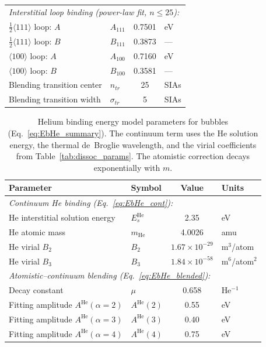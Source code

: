 \documentclass[pdflatex,sn-basic]{sn-jnl} %
\begin{document}
\begin{table}[htbp]
\begin{tabular}{@{}llcl@{}}
\multicolumn{4}{l}{\emph{Interstitial loop binding (power-law fit, $n \leq 25$):}} \\
$\frac{1}{2}\langle111\rangle$ loop: $A$ & $A_{111}$ & 0.7501 & eV \\
$\frac{1}{2}\langle111\rangle$ loop: $B$ & $B_{111}$ & 0.3873 & --- \\
$\langle100\rangle$ loop: $A$ & $A_{100}$ & 0.7160 & eV \\
$\langle100\rangle$ loop: $B$ & $B_{100}$ & 0.3581 & --- \\
Blending transition center & $n_{tr}$ & 25 & SIAs \\
Blending transition width & $\sigma_{tr}$ & 5 & SIAs \\
\bottomrule
\end{tabular}
\end{table}

\begin{table}[htbp]
\centering
\caption{Helium binding energy model parameters for bubbles
(Eq.~\ref{eq:EbHe_summary}). The continuum term uses the He solution energy,
the thermal de~Broglie wavelength, and the virial coefficients from
Table~\ref{tab:dissoc_params}. The atomistic correction decays exponentially
with $m$.}
\label{tab:He_binding_params}
\renewcommand{\arraystretch}{1.15}
\begin{tabular}{@{}llcl@{}}
\toprule
\textbf{Parameter} & \textbf{Symbol} & \textbf{Value} & \textbf{Units} \\
\midrule
\multicolumn{4}{l}{\emph{Continuum He binding (Eq.~\ref{eq:EbHe_cont}):}} \\
He interstitial solution energy & $E_s^{\mathrm{He}}$ & 2.35 & eV \\
He atomic mass & $m_{\mathrm{He}}$ & 4.0026 & amu \\
He virial $B_2$ & $B_2$ & $1.67\times10^{-29}$ & m$^3$/atom \\
He virial $B_3$ & $B_3$ & $1.84\times10^{-58}$ & m$^6$/atom$^2$ \\[4pt]

\multicolumn{4}{l}{\emph{Atomistic--continuum blending (Eq.~\ref{eq:EbHe_blended}):}} \\
Decay constant & $\mu$ & 0.658 & He$^{-1}$ \\
Fitting amplitude $A^{\mathrm{He}}(\alpha=2)$ & $A^{\mathrm{He}}(2)$ & 0.55 & eV \\
Fitting amplitude $A^{\mathrm{He}}(\alpha=3)$ & $A^{\mathrm{He}}(3)$ & 0.40 & eV \\
Fitting amplitude $A^{\mathrm{He}}(\alpha=4)$ & $A^{\mathrm{He}}(4)$ & 0.75 & eV \\
\bottomrule
\end{tabular}
\end{table}
\end{document}
